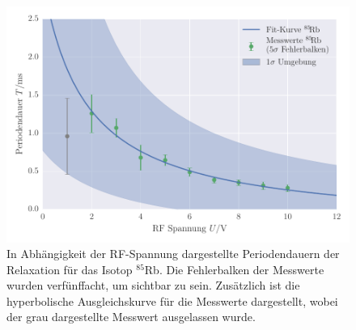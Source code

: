 \FloatBarrier
\begin{figure}[!h]
\centering
\includegraphics[scale=.85]{../Grafiken/Transienteneffekt_ausgelassen_Rubidium_85.pdf}
\caption{In Abhängigkeit der RF-Spannung dargestellte Periodendauern der Relaxation
	für das Isotop ${}^{85}\!$Rb. Die Fehlerbalken der Messwerte wurden verfünffacht, 
	um sichtbar zu sein. Zusätzlich ist die hyperbolische Ausgleichskurve für die Messwerte
	dargestellt, wobei der grau dargestellte Messwert ausgelassen wurde. 
	\label{fig:transienteneffekt_ausgelassen_rubidium_85}}
\end{figure}
\FloatBarrier